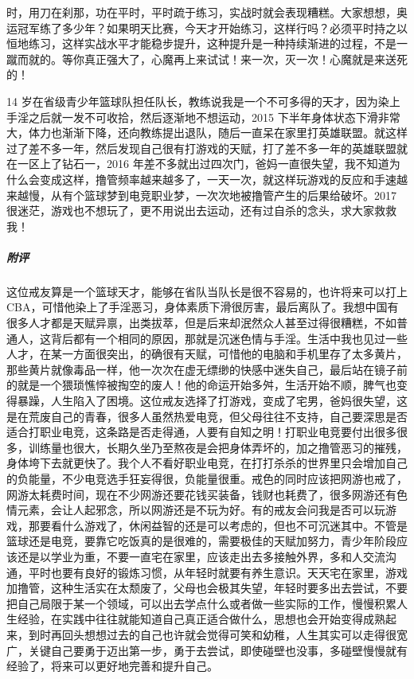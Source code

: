 \begin{case}
时，用刀在刹那，功在平时，平时疏于练习，实战时就会表现糟糕。大家想想，奥运冠军练了多少年？如果明天比赛，今天才开始练习，这样行吗？必须平时持之以恒地练习，这样实战水平才能稳步提升，这种提升是一种持续渐进的过程，不是一蹴而就的。等你真正强大了，心魔再上来试试！来一次，灭一次！心魔就是来送死的！
\end{case}

\begin{case}
    14 岁在省级青少年篮球队担任队长，教练说我是一个不可多得的天才，因为染上手淫之后就一发不可收拾，然后逐渐地不想运动，2015 下半年身体状态下滑非常大，体力也渐渐下降，还向教练提出退队，随后一直呆在家里打英雄联盟。就这样过了差不多一年，然后发现自己很有打游戏的天赋，打了差不多一年的英雄联盟就在一区上了钻石一，2016 年差不多就出过四次门，爸妈一直很失望，我不知道为什么会变成这样，撸管频率越来越多了，一天一次，就这样玩游戏的反应和手速越来越慢，从有个篮球梦到电竞职业梦，一次次地被撸管产生的后果给破坏。2017 很迷茫，游戏也不想玩了，更不用说出去运动，还有过自杀的念头，求大家救救我！
    \subparagraph{附评} 这位戒友算是一个篮球天才，能够在省队当队长是很不容易的，也许将来可以打上 CBA，可惜他染上了手淫恶习，身体素质下滑很厉害，最后离队了。我想中国有很多人才都是天赋异禀，出类拔萃，但是后来却泯然众人甚至过得很糟糕，不如普通人，这背后都有一个相同的原因，那就是沉迷色情与手淫。生活中我也见过一些人才，在某一方面很突出，的确很有天赋，可惜他的电脑和手机里存了太多黄片，那些黄片就像毒品一样，他一次次在虚无缥缈的快感中迷失自己，最后站在镜子前的就是一个猥琐憔悴被掏空的废人！他的命运开始多舛，生活开始不顺，脾气也变得暴躁，人生陷入了困境。这位戒友选择了打游戏，变成了宅男，爸妈很失望，这是在荒废自己的青春，很多人虽然热爱电竞，但父母往往不支持，自己要深思是否适合打职业电竞，这条路是否走得通，人要有自知之明！打职业电竞要付出很多很多，训练量也很大，长期久坐乃至熬夜是会把身体弄坏的，加之撸管恶习的摧残，身体垮下去就更快了。我个人不看好职业电竞，在打打杀杀的世界里只会增加自己的负能量，不少电竞选手狂妄得很，负能量很重。戒色的同时应该把网游也戒了，网游太耗费时间，现在不少网游还要花钱买装备，钱财也耗费了，很多网游还有色情元素，会让人起邪念，所以网游还是不玩为好。有的戒友会问我是否可以玩游戏，那要看什么游戏了，休闲益智的还是可以考虑的，但也不可沉迷其中。不管是篮球还是电竞，要靠它吃饭真的是很难的，需要极佳的天赋加努力，青少年阶段应该还是以学业为重，不要一直宅在家里，应该走出去多接触外界，多和人交流沟通，平时也要有良好的锻炼习惯，从年轻时就要有养生意识。天天宅在家里，游戏加撸管，这种生活实在太颓废了，父母也会极其失望，年轻时要多出去尝试，不要把自己局限于某一个领域，可以出去学点什么或者做一些实际的工作，慢慢积累人生经验，在实践中往往就能知道自己真正适合做什么，思想也会开始变得成熟起来，到时再回头想想过去的自己也许就会觉得可笑和幼稚，人生其实可以走得很宽广，关键自己要勇于迈出第一步，勇于去尝试，即使碰壁也没事，多碰壁慢慢就有经验了，将来可以更好地完善和提升自己。
\end{case}

